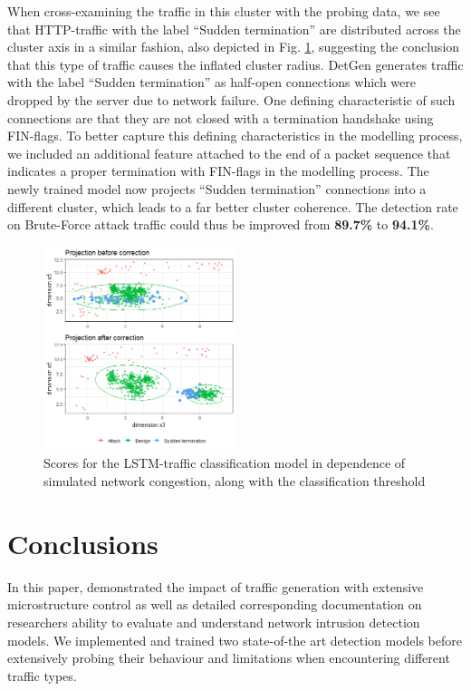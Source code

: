 \documentclass[conference]{IEEEtran}
\begin{document}
When cross-examining the traffic in this cluster with the probing data, we see that HTTP-traffic with the label \enquote{Sudden termination} are distributed across the cluster axis in a similar fashion, also depicted in Fig. \ref{fig:Subspace_projection}, suggesting the conclusion that this type of traffic causes the inflated cluster radius. DetGen generates traffic with the label \enquote{Sudden termination} as half-open connections which were dropped by the server due to network failure. One defining characteristic of such connections are that they are not closed with a termination handshake using FIN-flags. To better capture this defining characteristics in the modelling process, we included an additional feature attached to the end of a packet sequence that indicates a proper termination with FIN-flags in the modelling process.
The newly trained model now projects \enquote{Sudden termination} connections into a different cluster, which leads to a far better cluster coherence. The detection rate on Brute-Force attack traffic could thus be improved from \textbf{89.7\%} to \textbf{94.1\%}.

\begin{figure}
\centering
\includegraphics[width=0.5\textwidth]{images/Subspace_projection_new3.png}
\caption{Scores for the LSTM-traffic classification model in dependence of simulated network congestion, along with the classification threshold}\label{fig:Subspace_projection}
\end{figure}


\section{Conclusions}\label{Sec:Conclusion}

In this paper, demonstrated the impact of traffic generation with extensive microstructure control as well as detailed corresponding documentation on researchers ability to evaluate and understand network intrusion detection models. We implemented and trained two state-of-the art detection models before extensively probing their behaviour and limitations when encountering different traffic types. 
\end{document}
